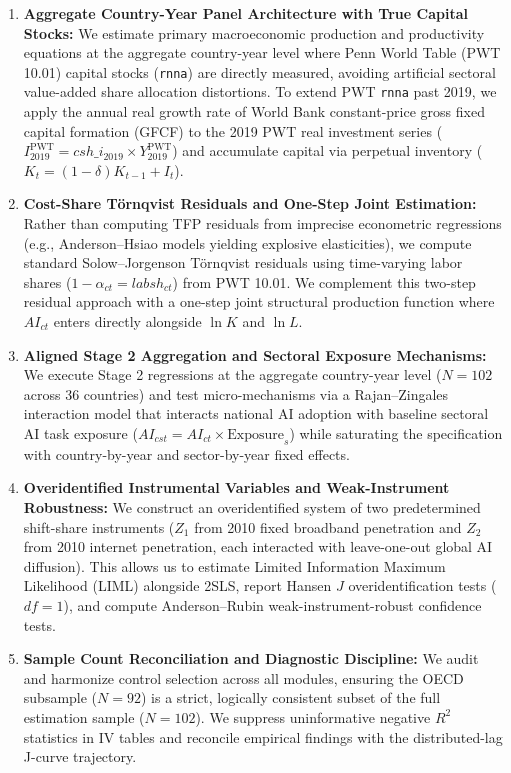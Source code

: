 \documentclass[11pt,a4paper]{article}
\begin{document}
\begin{enumerate}
    \item \textbf{Aggregate Country-Year Panel Architecture with True Capital Stocks:} We estimate primary macroeconomic production and productivity equations at the aggregate country-year level where Penn World Table (PWT 10.01) capital stocks (\texttt{rnna}) are directly measured, avoiding artificial sectoral value-added share allocation distortions. To extend PWT \texttt{rnna} past 2019, we apply the annual real growth rate of World Bank constant-price gross fixed capital formation (GFCF) to the 2019 PWT real investment series ($I_{2019}^{\text{PWT}} = csh\_i_{2019} \times Y_{2019}^{\text{PWT}}$) and accumulate capital via perpetual inventory ($K_t = (1-\delta)K_{t-1} + I_t$).
    \item \textbf{Cost-Share Törnqvist Residuals and One-Step Joint Estimation:} Rather than computing TFP residuals from imprecise econometric regressions (e.g., Anderson--Hsiao models yielding explosive elasticities), we compute standard Solow--Jorgenson Törnqvist residuals using time-varying labor shares ($1 - \alpha_{ct} = labsh_{ct}$) from PWT 10.01. We complement this two-step residual approach with a one-step joint structural production function where $AI_{ct}$ enters directly alongside $\ln K$ and $\ln L$.
    \item \textbf{Aligned Stage 2 Aggregation and Sectoral Exposure Mechanisms:} We execute Stage 2 regressions at the aggregate country-year level ($N = 102$ across 36 countries) and test micro-mechanisms via a Rajan--Zingales interaction model that interacts national AI adoption with baseline sectoral AI task exposure ($AI_{cst} = AI_{ct} \times \text{Exposure}_s$) while saturating the specification with country-by-year and sector-by-year fixed effects.
    \item \textbf{Overidentified Instrumental Variables and Weak-Instrument Robustness:} We construct an overidentified system of two predetermined shift-share instruments ($Z_1$ from 2010 fixed broadband penetration and $Z_2$ from 2010 internet penetration, each interacted with leave-one-out global AI diffusion). This allows us to estimate Limited Information Maximum Likelihood (LIML) alongside 2SLS, report Hansen $J$ overidentification tests ($df=1$), and compute Anderson--Rubin weak-instrument-robust confidence tests.
    \item \textbf{Sample Count Reconciliation and Diagnostic Discipline:} We audit and harmonize control selection across all modules, ensuring the OECD subsample ($N = 92$) is a strict, logically consistent subset of the full estimation sample ($N = 102$). We suppress uninformative negative $R^2$ statistics in IV tables and reconcile empirical findings with the distributed-lag J-curve trajectory.
\end{enumerate}
\end{document}
